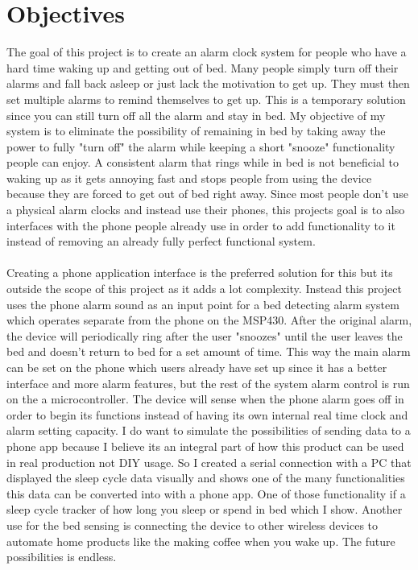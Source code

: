 \documentclass[11pt]{article}
\begin{document}
\newpage
\tableofcontents
\newpage

\section{Objectives}
The goal of this project is to create an alarm clock system for people who have a hard time waking up and getting out of bed.
Many people simply turn off their alarms and fall back asleep or just lack the motivation to get up.
They must then set multiple alarms to remind themselves to get up.
This is a temporary solution since you can still turn off all the alarm and stay in bed.
My objective of my system is to eliminate the possibility of remaining in bed by taking away the power to fully "turn off" the alarm while keeping a short "snooze" functionality people can enjoy. 
A consistent alarm that rings while in bed is not beneficial to waking up as it gets annoying fast and stops people from using the device because they are forced to get out of bed right away.  
Since most people don't use a physical alarm clocks and instead use their phones, this projects goal is to also interfaces with the phone people already use in order to add functionality to it instead of removing an already fully perfect functional system.\\
\\
Creating a phone application interface is the preferred solution for this but its outside the scope of this project as it adds a lot complexity. 
Instead this project uses the phone alarm sound as an input point for a bed detecting alarm system which operates separate from the phone on the MSP430.
After the original alarm, the device will periodically ring after the user "snoozes" until the user leaves the bed and doesn't return to bed for a set amount of time.
This way the main alarm can be set on the phone which users already have set up since it has a better interface and more alarm features, but the rest of the system alarm control is run on the a microcontroller. 
The device will sense when the phone alarm goes off in order to begin its functions instead of having its own internal real time clock and alarm setting capacity.
I do want to simulate the possibilities of sending data to a phone app because I believe its an integral part of how this product can be used in real production not DIY usage. 
So I created a serial connection with a PC that displayed the sleep cycle data visually and shows one of the many functionalities this data can be converted into with a phone app.
One of those functionality if a sleep cycle tracker of how long you sleep or spend in bed which I show. 
Another use for the bed sensing is connecting the device to other wireless devices to automate home products like the making coffee when you wake up.
The future possibilities is endless.\\
\\
\end{document}
